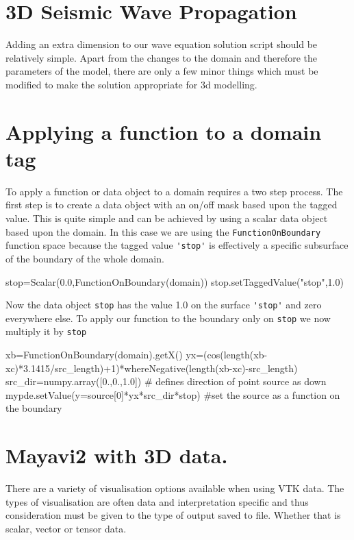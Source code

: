\section{3D Seismic Wave Propagation}
Adding an extra dimension to our wave equation solution script should be
relatively simple. Apart from the changes to the domain and therefore the
parameters of the model, there are only a few minor things which must be
modified to make the solution appropriate for 3d modelling.

\section{Applying a function to a domain tag}
To apply a function or data object to a domain requires a two step process. The
first step is to create a data object with an on/off mask based upon the tagged
value. This is quite simple and can be achieved by using a scalar data object
based upon the domain. In this case we are using the \verb!FunctionOnBoundary!
function space because the tagged value \verb!'stop'! is effectively a specific
subsurface of the boundary of the whole domain. 
\begin{python}
stop=Scalar(0.0,FunctionOnBoundary(domain))
stop.setTaggedValue("stop",1.0)
\end{python}
Now the data object \verb|stop| has the value 1.0 on the surface
\verb!'stop'! and zero everywhere else.
% 
 To apply our function to the boundary only on \verb|stop| we now
 multiply it by \verb|stop|
\begin{python}
xb=FunctionOnBoundary(domain).getX()
yx=(cos(length(xb-xc)*3.1415/src_length)+1)*whereNegative(length(xb-xc)-src_length)
src_dir=numpy.array([0.,0.,1.0]) # defines direction of point source as down
mypde.setValue(y=source[0]*yx*src_dir*stop) #set the source as a function on the boundary
\end{python}

\section{Mayavi2 with 3D data.}
There are a variety of visualisation options available when using VTK data. The
types of visualisation are often data and interpretation specific and thus
consideration must be given to the type of output saved to file. Whether that is
scalar, vector or tensor data.

